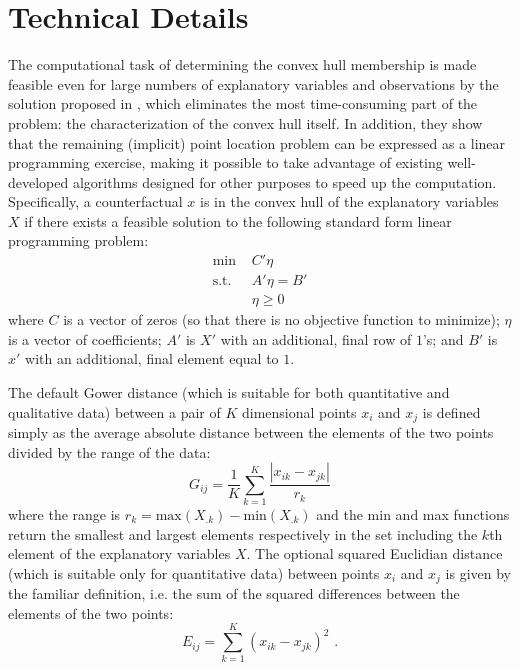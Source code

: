 \documentclass[oneside,letterpaper,titlepage]{article}
\begin{document}
\section{Technical Details}

The computational task of determining the convex hull membership is
made feasible even for large numbers of explanatory variables and
observations by the solution proposed in \citet{KinZen06}, which
eliminates the most time-consuming part of the problem: the
characterization of the convex hull itself.  In addition, they show
that the remaining (implicit) point location problem can be expressed
as a linear programming exercise, making it possible to take advantage
of existing well-developed algorithms designed for other purposes to
speed up the computation.  Specifically, a counterfactual $x$ is in
the convex hull of the explanatory variables $X$ if there exists a
feasible solution to the following standard form linear programming
problem:
\begin{align}
\label{lp}
\text{min }  & C'\eta           \nonumber\\
\text{s.t. } & A'\eta=B'                \\
            & \eta \geq 0      \nonumber
\end{align}
where $C$ is a vector of zeros (so that there is no objective function
to minimize); $\eta$ is a vector of coefficients; $A'$ is $X'$ with an
additional, final row of $1$'s; and $B'$ is $x'$ with an additional,
final element equal to $1$.

The default Gower distance (which is suitable for both quantitative
and qualitative data) between a pair of $K$ dimensional points $x_i$
and $x_j$ is defined simply as the average absolute distance between
the elements of the two points divided by the range of the data:
\begin{equation}
  \label{gower}
  G_{ij} = \frac{1}{K}\sum_{k=1}^K \frac{\left| x_{ik} - 
x_{jk}\right|}{r_k}
\end{equation}
where the range is $r_k = \text{max}(X_{.k}) - \text{min}(X_{.k})$ and
the min and max functions return the smallest and largest elements
respectively in the set including the $k$th element of the explanatory
variables $X$.  The optional squared Euclidian distance (which is
suitable only for quantitative data) between points $x_{i}$ and
$x_{j}$ is given by the familiar definition, i.e. the sum of the
squared differences between the elements of the two points:
\begin{equation}
  E_{ij} = \sum_{k=1}^K (x_{ik} - x_{jk})^2 \mbox{ .}
\end{equation}
\end{document}
